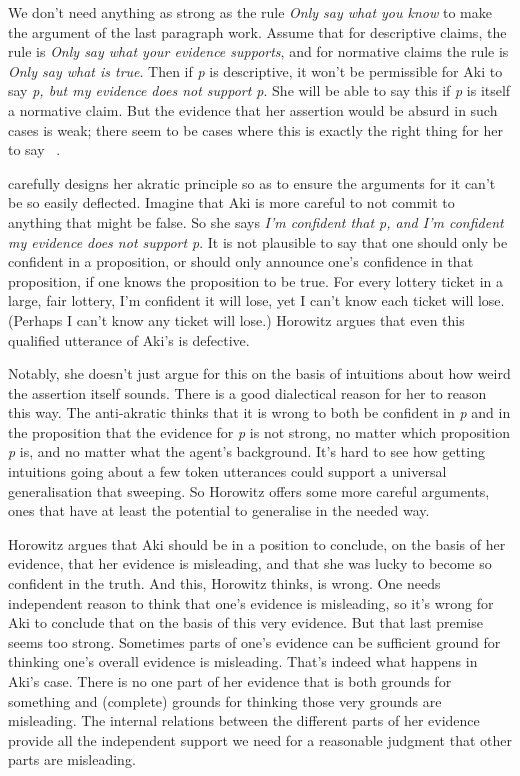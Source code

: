 We don't need anything as strong as the rule \emph{Only say what you know} to make the argument of the last paragraph work. Assume that for descriptive claims, the rule is \emph{Only say what your evidence supports}, and for normative claims the rule is \emph{Only say what is true}. Then if \emph{p} is descriptive, it won't be permissible for \gls{Aki} to say \emph{p, but my evidence does not support p}. She will be able to say this if \emph{p} is itself a normative claim. But the evidence that her assertion would be absurd in such cases is weak; there seem to be cases where this is exactly the right thing for her to say ~\citep{WeathersonMaitra2010}.

\citet{Horowitz2014} carefully designs her akratic principle so as to ensure the arguments for it can't be so easily deflected. Imagine that \gls{Aki} is more careful to not commit to anything that might be false. So she says \emph{I'm confident that p, and I'm confident my evidence does not support p}. It is not plausible to say that one should only be confident in a proposition, or should only announce one's confidence in that proposition, if one knows the proposition to be true. For every lottery ticket in a large, fair lottery, I'm confident it will lose, yet I can't know each ticket will lose. (Perhaps I can't know any ticket will lose.) Horowitz argues that even this qualified utterance of \gls{Aki}'s is defective.

Notably, she doesn't just argue for this on the basis of intuitions about how weird the assertion itself sounds. There is a good dialectical reason for her to reason this way. The anti-akratic thinks that it is wrong to both be confident in \emph{p} and in the proposition that the evidence for \emph{p} is not strong, no matter which proposition \emph{p} is, and no matter what the agent's background. It's hard to see how getting intuitions going about a few token utterances could support a universal generalisation that sweeping. So Horowitz offers some more careful arguments, ones that have at least the potential to generalise in the needed way.

Horowitz argues that \gls{Aki} should be in a position to conclude, on the basis of her evidence, that her evidence is misleading, and that she was lucky to become so confident in the truth. And this, Horowitz thinks, is wrong. One needs independent reason to think that one's evidence is misleading, so it's wrong for \gls{Aki} to conclude that on the basis of this very evidence. But that last premise seems too strong. Sometimes parts of one's evidence can be sufficient ground for thinking one's overall evidence is misleading. That's indeed what happens in \gls{Aki}'s case. There is no one part of her evidence that is both grounds for something and (complete) grounds for thinking those very grounds are misleading. The internal relations between the different parts of her evidence provide all the independent support we need for a reasonable judgment that other parts are misleading.

